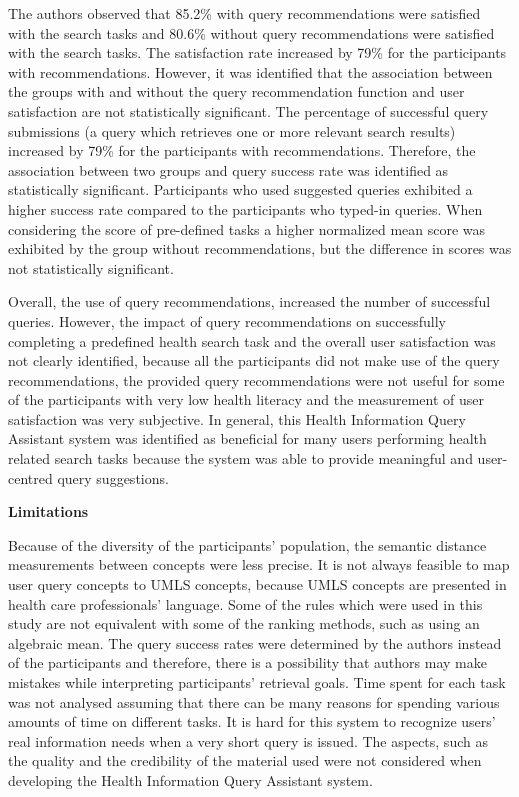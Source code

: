 \documentclass[]{article}
\begin{document}
The authors observed that 85.2\% with query recommendations were satisfied with the search tasks and 80.6\% without query recommendations were satisfied with the search tasks. The satisfaction rate increased by 79\% for the participants with recommendations. However, it was identified that the association between the groups with and without the query recommendation function and user satisfaction are not statistically significant. The percentage of successful query submissions (a query which retrieves one or more relevant search results) increased by 79\% for the participants with recommendations. Therefore, the association between two groups and query success rate was identified as statistically significant. Participants who used suggested queries exhibited a higher success rate compared to the participants who typed-in queries. When considering the score of pre-defined tasks a higher normalized mean score was exhibited by the group without recommendations, but the difference in scores was not statistically significant.                     

Overall, the use of query recommendations, increased the number of successful queries. However, the impact of query recommendations on successfully completing a predefined health search task and the overall user satisfaction was not clearly identified, because all the participants did not make use of the query recommendations, the provided query recommendations were not useful for some of the participants with very low health literacy and the measurement of user satisfaction was very subjective. In general, this Health Information Query Assistant system was identified as beneficial for many users performing health related search tasks because the system was able to provide meaningful and user-centred query suggestions.

\textbf{Limitations}

Because of the diversity of the participants' population, the semantic distance measurements between concepts were less precise. It is not always feasible to map user query concepts to UMLS concepts, because UMLS concepts are presented in health care professionals’ language. Some of the rules which were used in this study are not equivalent with some of the ranking methods, such as using an algebraic mean. The query success rates were determined by the authors instead of the participants and therefore, there is a possibility that authors may make mistakes while interpreting participants' retrieval goals. Time spent for each task was not analysed assuming that there can be many reasons for spending various amounts of time on different tasks. It is hard for this system to recognize users' real information needs when a very short query is issued. The aspects, such as the quality and the credibility of the material used were not considered when developing the Health Information Query Assistant system.
\end{document}
